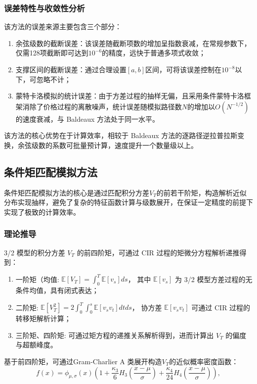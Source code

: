 \subsubsection{误差特性与收敛性分析}
该方法的误差来源主要包含三个部分：
\begin{enumerate}
  \item 余弦级数的截断误差：该误差随截断项数的增加呈指数衰减，在常规参数下，仅需128项截断即可达到$10^{-6}$的精度，远快于普通多项式收敛；
  \item 支撑区间的截断误差：通过合理设置$[a,b]$区间，可将该误差控制在$10^{-8}$以下，可忽略不计；
  \item 蒙特卡洛模拟的统计误差：由于方差过程的抽样无偏，且采用条件蒙特卡洛框架消除了价格过程的离散噪声，统计误差随模拟路径数$N$的增加以$O(N^{-1/2})$的速度衰减，与 Baldeaux 方法处于同一水平。
\end{enumerate}
该方法的核心优势在于计算效率，相较于 Baldeaux 方法的逐路径逆拉普拉斯变换，余弦级数的系数可批量预计算，速度提升一个数量级以上。

\subsection{条件矩匹配模拟方法}
条件矩匹配模拟方法的核心是通过匹配积分方差$V_T$的前若干阶矩，构造解析近似分布实现抽样，避免了复杂的特征函数计算与级数展开，在保证一定精度的前提下实现了极致的计算效率。

\subsubsection{理论推导}
3/2 模型的积分方差 $V_T$ 的前四阶矩，可通过 CIR 过程的矩微分方程解析递推得到：
\begin{enumerate}
    \item 一阶矩（均值: 
    $\mathbb{E}[V_T] = \int_0^T \mathbb{E}[v_s] ds$，
    其中 $\mathbb{E}[v_s]$ 为 3/2 模型方差过程的无条件均值，具有闭式表达；

    \item 二阶矩: 
    $\mathbb{E}[V_T^2] = 2 \int_0^T \int_0^s \mathbb{E}[v_s v_t] dtds$，
    协方差 $\mathbb{E}[v_s v_t]$ 可通过 CIR 过程的转移矩解析计算；

    \item 三阶矩、四阶矩: 
    可通过矩方程的递推关系解析得到，进而计算出 $V_T$ 的偏度与超额峰度。
\end{enumerate}
基于前四阶矩，可通过Gram-Charlier A 类展开构造$V_T$的近似概率密度函数：
\begin {equation}
  f (x) = \phi_{\mu,\sigma}(x) \left ( 1 + \frac {\kappa_3}{6} H_3\left ( \frac {x-\mu}{\sigma} \right) + \frac {\kappa_4}{24} H_4\left ( \frac {x-\mu}{\sigma} \right) \right),
\end {equation}

